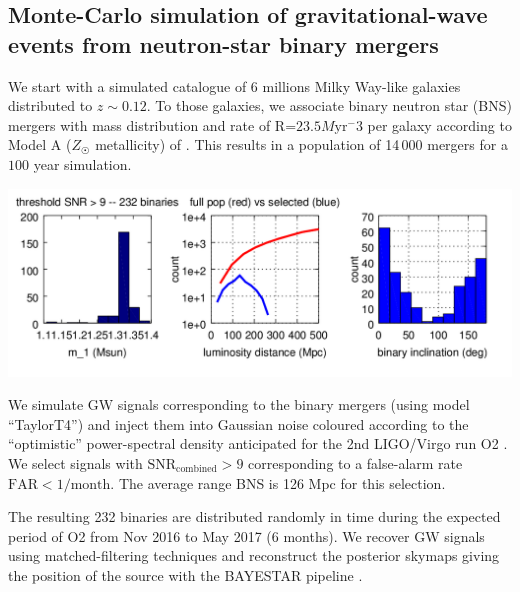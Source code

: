 \documentclass[a0,portrait]{a0poster}
\begin{document}
\begin{multicols}{2}
\section*{Monte-Carlo simulation of gravitational-wave events from neutron-star binary mergers}

We start with a simulated catalogue of 6 millions Milky Way-like galaxies
distributed to $z\sim 0.12$. To those galaxies, we associate binary neutron star
(BNS) mergers with mass distribution and rate of R=$23.5 M\mathrm{yr}^-3$ per galaxy
according to Model A ($Z_{\astrosun}$ metallicity) of
\cite{dominik12:_doubl_compac_objec}. This results in a population of 14\,000
mergers for a $100$ year simulation.

\begin{center}\vspace{.5cm}
    \includegraphics[width=30cm]{figures/summary_plot.png}
\end{center}

We simulate GW signals corresponding to the binary mergers (using model
``TaylorT4'') and inject them into Gaussian noise coloured according to the
``optimistic'' power-spectral density anticipated for the 2nd LIGO/Virgo run O2
\cite{lrr-2016-1}. We select signals with $\mathrm{SNR}_{\mathrm{combined}} > 9$
corresponding to a false-alarm rate $\mathrm{FAR} < 1/\mathrm{month}$. The average range
BNS is 126 Mpc for this selection.

The resulting 232 binaries are distributed randomly in time during the expected
period of O2 from Nov 2016 to May 2017 (6 months). We recover GW signals using
matched-filtering techniques and reconstruct the posterior skymaps giving the
position of the source with the BAYESTAR pipeline \cite{PhysRevD.93.024013}.



\end{multicols}
\end{document}
